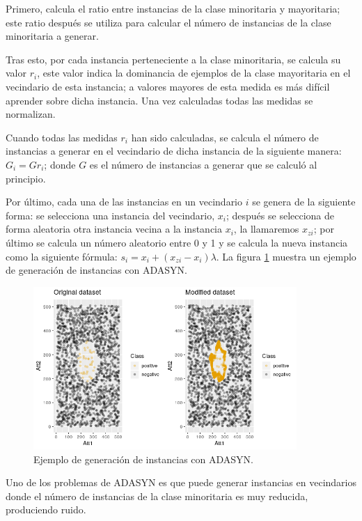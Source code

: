 Primero, calcula el ratio entre instancias de la clase minoritaria y mayoritaria; este ratio después se utiliza para calcular el número de instancias de la clase minoritaria a generar.\newline

Tras esto, por cada instancia perteneciente a la clase minoritaria, se calcula su valor $r_i$, este valor indica la dominancia de ejemplos de la clase mayoritaria en el vecindario de esta instancia; a valores mayores de esta medida es más difícil aprender sobre dicha instancia. Una vez calculadas todas las medidas se normalizan.\newline

Cuando todas las medidas $r_i$ han sido calculadas, se calcula el número de instancias a generar en el vecindario de dicha instancia de la siguiente manera: $G_i = G r_i$; donde $G$ es el número de instancias a generar que se calculó al principio.\newline
\newpage

Por último, cada una de las instancias en un vecindario $i$ se genera de la siguiente forma: se selecciona una instancia del vecindario, $x_i$; después se selecciona de forma aleatoria otra instancia vecina a la instancia $x_i$, la llamaremos $x_{zi}$; por último se calcula un número aleatorio entre 0 y 1 y se calcula la nueva instancia como la siguiente fórmula: $ s_i = x_i + (x_{zi}-x_i)\lambda$. La figura \ref{fig:43} muestra un ejemplo de generación de instancias con ADASYN.\newline

\begin{figure}[h]
	\centering
	\includegraphics[width=100mm]{imagenes/ADASYN_comparison.png}
	\caption{Ejemplo de generación de instancias con ADASYN.}
	\label{fig:43}
\end{figure}
\verticalspace

Uno de los problemas de ADASYN es que puede generar instancias en vecindarios donde el número de instancias de la clase minoritaria es muy reducida, produciendo ruido.
